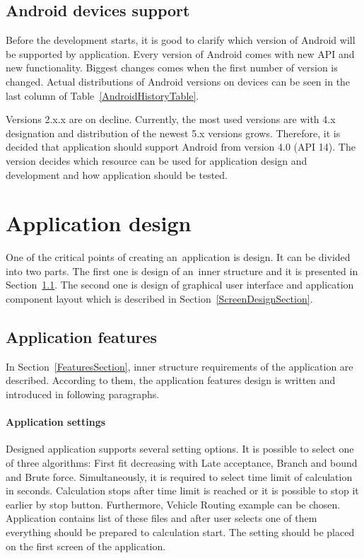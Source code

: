 \subsection{Android devices support}
Before the development starts, it is good to clarify which version of Android will be supported by application. Every
version of Android comes with new API and new functionality. Biggest changes comes when the first number of version is
changed. Actual distributions of Android versions on devices can be seen in the last column of
Table~\ref{AndroidHistoryTable}.

Versions 2.x.x are on decline. Currently, the most used versions are with 4.x designation and distribution of the newest
5.x versions grows. Therefore, it is decided that application should support Android from version 4.0 (API 14). The
version decides which resource can be used for application design and development and how application should be tested.

\section{Application design}\label{ApplicationDesignSection}
One of the critical points of creating an~application is design. It can be divided into two parts. The first one is
design of an~inner structure and it is presented in Section~\ref{ApplicationFeatureSection}. The second one is design
of graphical user interface and application component layout which is described in Section~\ref{ScreenDesignSection}.

\subsection{Application features}\label{ApplicationFeatureSection}
In Section~\ref{FeaturesSection}, inner structure requirements of the application are described. According to them, the
application features design is written and introduced in following paragraphs.

\paragraph{Application settings}
Designed application supports several setting options. It is possible to select one of three algorithms: First fit
decreasing with Late acceptance, Branch and bound and Brute force. Simultaneously, it is required to select time limit
of calculation in seconds. Calculation stops after time limit is reached or it is possible to stop it earlier by stop
button. Furthermore, Vehicle Routing example can be chosen. Application contains list of these files and after user
selects one of them everything should be prepared to calculation start. The setting should be placed on the first screen
of the application.

